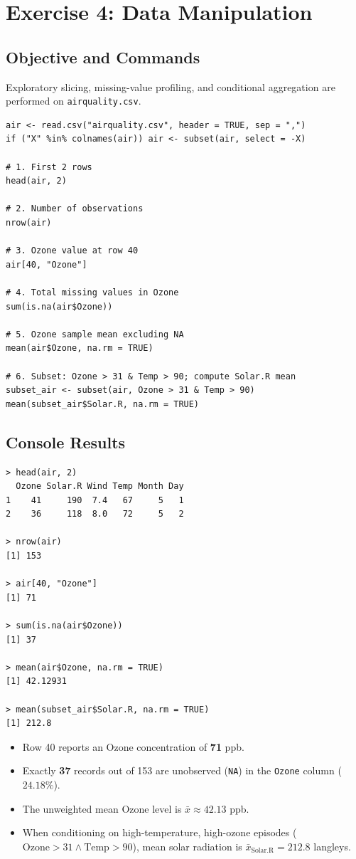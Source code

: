 \documentclass[11pt,a4paper]{article}
\begin{document}
\section{Exercise 4: Data Manipulation}

\subsection{Objective and Commands}
Exploratory slicing, missing-value profiling, and conditional aggregation are performed on \texttt{airquality.csv}.

\begin{lstlisting}
air <- read.csv("airquality.csv", header = TRUE, sep = ",")
if ("X" %in% colnames(air)) air <- subset(air, select = -X)

# 1. First 2 rows
head(air, 2)

# 2. Number of observations
nrow(air)

# 3. Ozone value at row 40
air[40, "Ozone"]

# 4. Total missing values in Ozone
sum(is.na(air$Ozone))

# 5. Ozone sample mean excluding NA
mean(air$Ozone, na.rm = TRUE)

# 6. Subset: Ozone > 31 & Temp > 90; compute Solar.R mean
subset_air <- subset(air, Ozone > 31 & Temp > 90)
mean(subset_air$Solar.R, na.rm = TRUE)
\end{lstlisting}

\subsection{Console Results}
\begin{lstlisting}[language={}]
> head(air, 2)
  Ozone Solar.R Wind Temp Month Day
1    41     190  7.4   67     5   1
2    36     118  8.0   72     5   2

> nrow(air)
[1] 153

> air[40, "Ozone"]
[1] 71

> sum(is.na(air$Ozone))
[1] 37

> mean(air$Ozone, na.rm = TRUE)
[1] 42.12931

> mean(subset_air$Solar.R, na.rm = TRUE)
[1] 212.8
\end{lstlisting}
\begin{itemize}
    \item Row 40 reports an Ozone concentration of \textbf{71} ppb.
    \item Exactly \textbf{37} records out of 153 are unobserved (\texttt{NA}) in the \texttt{Ozone} column ($24.18\%$).
    \item The unweighted mean Ozone level is $\bar{x} \approx 42.13$ ppb.
    \item When conditioning on high-temperature, high-ozone episodes ($\text{Ozone} > 31 \land \text{Temp} > 90$), mean solar radiation is $\bar{x}_{\text{Solar.R}} = 212.8$ langleys.
\end{itemize}
\end{document}
